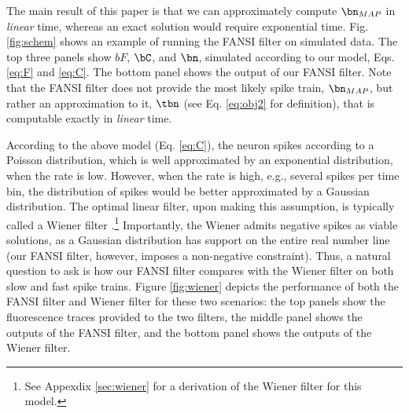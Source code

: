 The main result of this paper is that we can approximately compute $\bn_{MAP}$ in \emph{linear} time, whereas an exact solution would require exponential time. Fig. \ref{fig:schem} shows an example of running the FANSI filter on simulated data.  The top three panels show $bF$, $\bC$, and $\bn$, simulated according to our model, Eqs. \eqref{eq:F} and \eqref{eq:C}.  The bottom panel shows the output of our FANSI filter.  Note that the FANSI filter does not provide the most likely spike train, $\bn_{MAP}$, but rather an approximation to it, $\tbn$ (see Eq. \eqref{eq:obj2} for definition), that is computable exactly in \emph{linear} time.  




According to the above model (Eq. \eqref{eq:C}), the neuron spikes according to a Poisson distribution, which is well approximated by an exponential distribution, when the rate is low.  However, when the rate is high, e.g., several spikes per time bin, the distribution of spikes would be better approximated by a Gaussian distribution.  The optimal linear filter, upon making this assumption, is typically called a Wiener filter \cite{Wiener49}.\footnote{See Appexdix \ref{sec:wiener} for a derivation of the Wiener filter for this model.}  Importantly, the Wiener admits negative spikes as viable solutions, as a Gaussian distribution has support on the entire real number line (our FANSI filter, however, imposes a non-negative constraint).  Thus, a natural question to ask is how our FANSI filter compares with the Wiener filter on both slow and fast spike trains.  Figure \ref{fig:wiener} depicts the performance of both the FANSI filter and Wiener filter for these two scenarios: the top panels show the fluorescence traces provided to the two filters, the middle panel shows the outputs of the FANSI filter, and the bottom panel shows the outputs of the Wiener filter.

